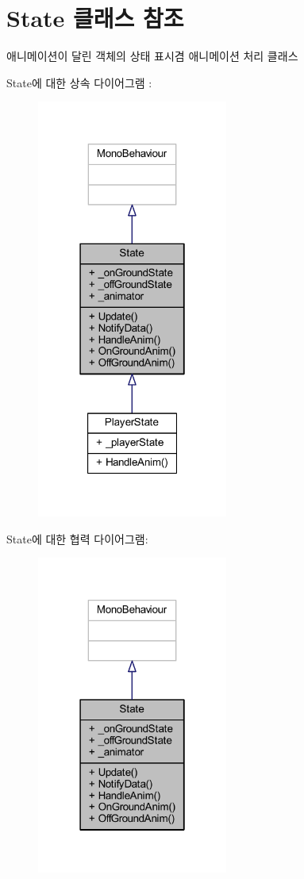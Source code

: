 \hypertarget{class_state}{}\section{State 클래스 참조}
\label{class_state}


애니메이션이 달린 객체의 상태 표시겸 애니메이션 처리 클래스  




State에 대한 상속 다이어그램 \+: 
\nopagebreak
\begin{figure}[H]
\begin{center}
\leavevmode
\includegraphics[width=178pt]{de/d06/class_state__inherit__graph}
\end{center}
\end{figure}


State에 대한 협력 다이어그램\+:
\nopagebreak
\begin{figure}[H]
\begin{center}
\leavevmode
\includegraphics[width=178pt]{dc/d8f/class_state__coll__graph}
\end{center}
\end{figure}
